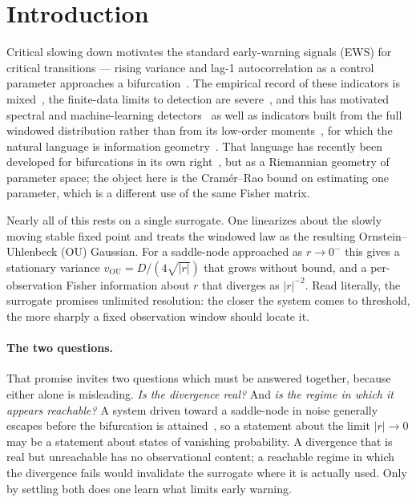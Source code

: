 \documentclass[%
 aip,
 cha,
 amsmath,amssymb,
 reprint,
 superscriptaddress,
 floatfix,
]{revtex4-2}
\begin{document}
\maketitle

\section{\label{sec:intro}Introduction}

Critical slowing down motivates the standard early-warning signals (EWS) for critical transitions --- rising variance and lag-1 autocorrelation as a control parameter approaches a bifurcation~\cite{Scheffer2009,Dakos2012,Kuehn2011}.  The empirical record of these indicators is mixed~\cite{Dakos2024,Ditlevsen2023}, the finite-data limits to detection are severe~\cite{Boettiger2012,Grziwotz2023}, and this has motivated spectral and machine-learning detectors~\cite{Bury2020,Bury2021} as well as indicators built from the full windowed distribution rather than from its low-order moments~\cite{Prokopenko2011}, for which the natural language is information geometry~\cite{Amari2000,Nielsen2020}.  That language has recently been developed for bifurcations in its own right~\cite{DaSilva2026}, but as a Riemannian geometry of parameter space; the object here is the Cram\'er--Rao bound on estimating one parameter, which is a different use of the same Fisher matrix.

Nearly all of this rests on a single surrogate.  One linearizes about the slowly moving stable fixed point and treats the windowed law as the resulting Ornstein--Uhlenbeck (OU) Gaussian.  For a saddle-node approached as $r\to0^-$ this gives a stationary variance $v_{\mathrm{OU}}=D/(4\sqrt{|r|})$ that grows without bound, and a per-observation Fisher information about $r$ that diverges as $|r|^{-2}$.  Read literally, the surrogate promises unlimited resolution: the closer the system comes to threshold, the more sharply a fixed observation window should locate it.

\paragraph{The two questions.}
That promise invites two questions which must be answered together, because either alone is misleading.  \emph{Is the divergence real?}  And \emph{is the regime in which it appears reachable?}  A system driven toward a saddle-node in noise generally escapes before the bifurcation is attained~\cite{Ashwin2012,Ritchie2016,BerglundGentz2006}, so a statement about the limit $|r|\to0$ may be a statement about states of vanishing probability.  A divergence that is real but unreachable has no observational content; a reachable regime in which the divergence fails would invalidate the surrogate where it is actually used.  Only by settling both does one learn what limits early warning.
\end{document}
